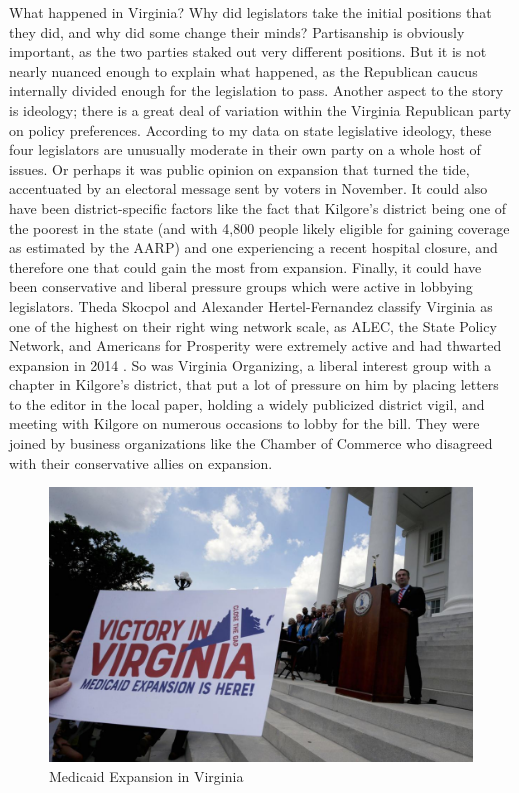 \documentclass[
  oneside]{book}
\begin{document}
What happened in Virginia? Why did legislators take the initial positions that they did, and why did some change their minds? Partisanship is obviously important, as the two parties staked out very different positions. But it is not nearly nuanced enough to explain what happened, as the Republican caucus internally divided enough for the legislation to pass. Another aspect to the story is ideology; there is a great deal of variation within the Virginia Republican party on policy preferences. According to my data on state legislative ideology, these four legislators are unusually moderate in their own party on a whole host of issues. Or perhaps it was public opinion on expansion that turned the tide, accentuated by an electoral message sent by voters in November. It could also have been district-specific factors like the fact that Kilgore's district being one of the poorest in the state (and with 4,800 people likely eligible for gaining coverage as estimated by the AARP) and one experiencing a recent hospital closure, and therefore one that could gain the most from expansion. Finally, it could have been conservative and liberal pressure groups which were active in lobbying legislators. Theda Skocpol and Alexander Hertel-Fernandez classify Virginia as one of the highest on their right wing network scale, as ALEC, the State Policy Network, and Americans for Prosperity were extremely active and had thwarted expansion in 2014 \citep{Hertel-Fernandez:2016}. So was Virginia Organizing, a liberal interest group with a chapter in Kilgore's district, that put a lot of pressure on him by placing letters to the editor in the local paper, holding a widely publicized district vigil, and meeting with Kilgore on numerous occasions to lobby for the bill. They were joined by business organizations like the Chamber of Commerce who disagreed with their conservative allies on expansion.

\begin{figure}
\includegraphics[width=0.99\linewidth]{Plots/Web/va_medicaid_expansion} \caption{Medicaid Expansion in Virginia}\label{fig:medicaid-expansion-va}
\end{figure}
\end{document}
